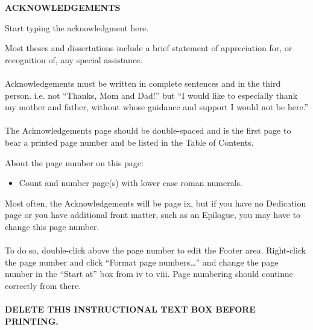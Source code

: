 \documentclass[a4paper,12pt,one side]{report}
\theoremstyle{definition}
\begin{document}
\newpage

\begin{center}
     \bf {ACKNOWLEDGEMENTS} 
\end{center}

Start typing the acknowledgment here. 

\begin{tcolorbox}[enhanced jigsaw,
    sharp corners,
    boxrule=0.5pt, 
    colback=blue!30!white,   
    borderline={0.5pt}{-2pt}{black,solid} %
 ]
 \begin{justify}
 Most theses and dissertations include a brief statement of appreciation for, or recognition of, any special assistance.\\~\\
Acknowledgements must be written in complete sentences and in the third person. i.e. not “Thanks, Mom and Dad!” but “I would like to especially thank my mother and father, without whose guidance and support I would not be here.”\\~\\
The Acknowledgements page should be double-spaced and is the first page to bear a printed page number and be listed in the Table of Contents.
\end{justify}
\end{tcolorbox}

\begin{tcolorbox}[enhanced jigsaw,
    sharp corners,
    boxrule=0.5pt, 
    colback=blue!30!white,   
    borderline={0.5pt}{-2pt}{black,solid} %
 ]
\begin{justify}
 About the page number on this page:
\begin{itemize}
    \item Count and number page(s) with lower case roman numerals.
\end{itemize}
Most often, the Acknowledgements will be page ix, but if you have no Dedication page or you have additional front matter, such as an Epilogue, you may have to change this page number.
\\~\\
To do so, double-click above the page number to edit the Footer area.  Right-click the page number and click “Format page numbers…” and change the page number in the “Start at” box from iv to viii.  Page numbering should continue correctly from there.
\\~\\
\bf {DELETE THIS INSTRUCTIONAL TEXT BOX BEFORE PRINTING.}
\end{justify}
\end{tcolorbox}
\end{document}
